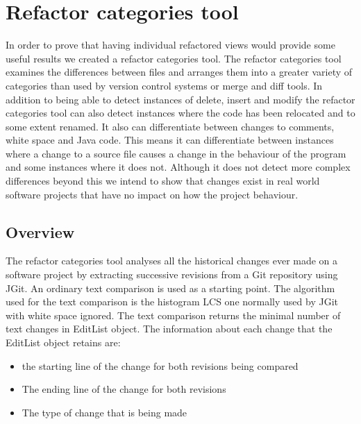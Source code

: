 
\chapter{Refactor categories tool}
In order to prove that having individual refactored views would provide some useful results we created a refactor categories tool. The refactor categories tool examines the differences between files and arranges them into a greater variety of categories than used by version control systems or merge and diff tools.  In addition to being able to detect instances of delete, insert and modify the refactor categories tool can also detect instances where the code has been relocated and to some extent renamed.  It also can differentiate between changes to comments, white space and Java code. This means it can differentiate between instances where a change to a source file causes a change in the behaviour of the program and some instances where it does not. Although it does not detect more complex differences beyond this we intend to show that changes exist in real world software projects that have no impact on how the project behaviour.



\section{Overview}
The refactor categories tool analyses all the historical changes ever made on a software project by extracting successive revisions from a Git repository using JGit.
An ordinary text comparison is used as a starting point.  The algorithm used for the text comparison is the histogram LCS one normally used by JGit with white space ignored. The text comparison returns the minimal number of text changes in EditList object.  The information about each change that the EditList object retains are:

\begin{itemize}
  \item the starting line of the change for both revisions being compared
  \item The ending line of the change for both revisions 
  \item The type of change that is being made
\end{itemize}

